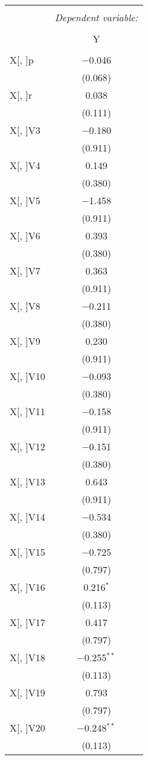 \documentclass[11pt, a4paper]{article}
\begin{document}
\begin{multicols}{2}
\FloatBarrier
\begin{center}
\begin{tabular}{@{\extracolsep{5pt}}lc} 
\\[-1.8ex]\hline 
\hline \\[-1.8ex] 
 & \multicolumn{1}{c}{\textit{Dependent variable:}} \\ 
\cline{2-2} 
\\[-1.8ex] & Y \\ 
\hline \\[-1.8ex] 
 X[, ]p & $-$0.046 \\ 
  & (0.068) \\  
 X[, ]r & 0.038 \\ 
  & (0.111) \\  
 X[, ]V3 & $-$0.180 \\ 
  & (0.911) \\  
 X[, ]V4 & 0.149 \\ 
  & (0.380) \\  
 X[, ]V5 & $-$1.458 \\ 
  & (0.911) \\  
 X[, ]V6 & 0.393 \\ 
  & (0.380) \\  
 X[, ]V7 & 0.363 \\ 
  & (0.911) \\  
 X[, ]V8 & $-$0.211 \\ 
  & (0.380) \\  
 X[, ]V9 & 0.230 \\ 
  & (0.911) \\ 
 X[, ]V10 & $-$0.093 \\ 
  & (0.380) \\  
 X[, ]V11 & $-$0.158 \\ 
  & (0.911) \\ 
 X[, ]V12 & $-$0.151 \\ 
  & (0.380) \\ 
 X[, ]V13 & 0.643 \\ 
  & (0.911) \\  
 X[, ]V14 & $-$0.534 \\ 
  & (0.380) \\ 
 X[, ]V15 & $-$0.725 \\ 
  & (0.797) \\  
 X[, ]V16 & 0.216$^{*}$ \\ 
  & (0.113) \\ 
 X[, ]V17 & 0.417 \\ 
  & (0.797) \\  
 X[, ]V18 & $-$0.255$^{**}$ \\ 
  & (0.113) \\ 
 X[, ]V19 & 0.793 \\ 
  & (0.797) \\  
 X[, ]V20 & $-$0.248$^{**}$ \\ 
  & (0.113) \\ 
\end{tabular} 
\end{center}
\FloatBarrier


\end{multicols}
\end{document}
